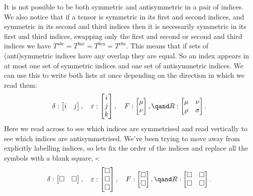 \documentclass[fleqn]{NotesClass}
\begin{document}
    It is not possible to be both symmetric and antisymmetric in a pair of indices.
    We also notice that if a tensor is symmetric in its first and second indices, and symmetric in its second and third indices then it is necessarily symmetric in its first and third indices, swapping only the first and second or second and third indices we have \(T^{abc} = T^{bac} = T^{bca} = T^{cba}\).
    This means that if sets of (anti)symmetric indices have any overlap they are equal.
    So an index appears in at most one set of symmetric indices and one set of antisymmetric indices.
    We can use this to write both lists at once depending on the direction in which we read them:
    \begin{equation}
        \delta: 
        \begin{bmatrix}
            i & j
        \end{bmatrix}
        , \quad \varepsilon: 
        \begin{bmatrix}
            i\\
            j\\
            k
        \end{bmatrix}
        , \quad F:
        \begin{bmatrix}
            \mu\\
            \nu
        \end{bmatrix}
        , \qand R: 
        \begin{bmatrix}
            \mu & \nu\\
            \rho & \sigma
        \end{bmatrix}
        .
    \end{equation}
    Here we read across to see which indices are symmetrised and read vertically to see which indices are antisymmetrised.
    We've been trying to move away from explicitly labelling indices, so lets fix the order of the indices and replace all the symbols with a blank square, \(\square\):
    \begin{equation}
        \delta: 
        \begin{bmatrix}
            \square & \square
        \end{bmatrix}
        , \quad \varepsilon: 
        \begin{bmatrix}
            \square\\
            \square\\
            \square
        \end{bmatrix}
        , \quad F:
        \begin{bmatrix}
            \square\\
            \square
        \end{bmatrix}
        , \qand R: 
        \begin{bmatrix}
            \square & \square\\
            \square & \square
        \end{bmatrix}
        .
    \end{equation}
\end{document}
